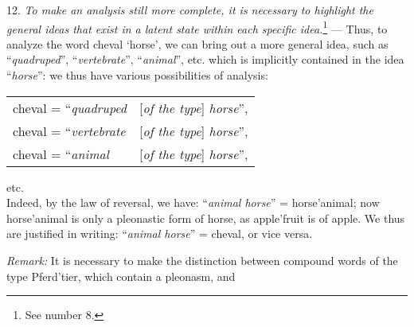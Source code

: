 {    12. \emph{To make an analysis still more complete, it is necessary
      to highlight the general ideas that exist in a latent state
      within each specific idea.}\footnote{See number 8.} --- Thus, to
    analyze the word \textup{cheval} `horse', we can bring out a more
    general idea, such as ``\emph{quadruped}'', ``\emph{vertebrate}'',
    ``\emph{animal}'', etc. which is implicitly contained in the idea
    ``\emph{horse}'': we thus have various possibilities of analysis:\\

    \begin{tabular}[b]{ll}
\textup{cheval} =	``\emph{quadruped}&[\emph{of the type}]	\emph{horse}'',\\
\textup{cheval} =	``\emph{vertebrate}&[\emph{of the type}]	\emph{horse}'',\\
\textup{cheval} =	``\emph{animal}&[\emph{of the type}]	\emph{horse}'',
    \end{tabular} etc.\\

   Indeed, by the law of reversal, we have: ``\emph{animal horse}'' =
   \textup{horse'animal}; now \textup{horse'ani\-mal} is only a
   pleonastic form of \textup{horse}, as \textup{apple'fruit} is of
   \textup{apple}. We thus are justified in writing: ``\emph{animal
     horse}'' = \textup{cheval}, or vice versa.

   \emph{Remark:} It is necessary to make the distinction between
   compound words of the type \textup{Pferd'tier}, which contain a
   pleonasm, and

  }

